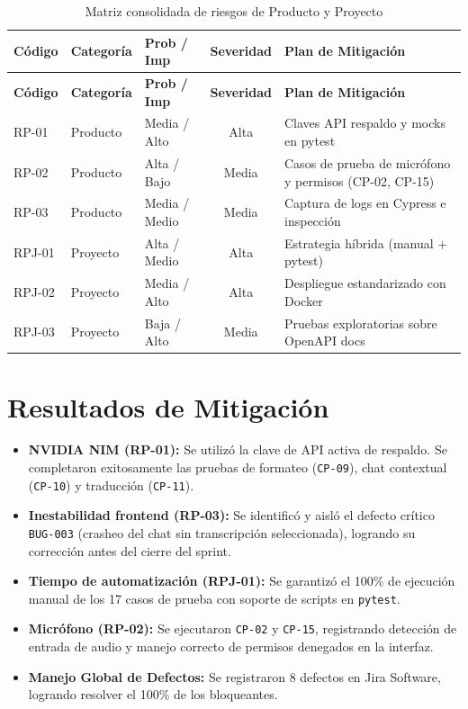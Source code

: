 \begin{longtable}{lllcp{4cm}}
\caption{Matriz consolidada de riesgos de Producto y Proyecto}
\label{tab:riesgos}\\
\toprule
\textbf{Código} & \textbf{Categoría} & \textbf{Prob / Imp} & \textbf{Severidad} & \textbf{Plan de Mitigación}\\
\midrule
\endfirsthead
\toprule
\textbf{Código} & \textbf{Categoría} & \textbf{Prob / Imp} & \textbf{Severidad} & \textbf{Plan de Mitigación}\\
\midrule
\endhead
\bottomrule
\endfoot

RP-01 & Producto & Media / Alto & Alta & Claves API respaldo y mocks en pytest\\

RP-02 & Producto & Alta / Bajo & Media & Casos de prueba de micrófono y permisos (CP-02, CP-15)\\

RP-03 & Producto & Media / Medio & Media & Captura de logs en Cypress e inspección\\

RPJ-01 & Proyecto & Alta / Medio & Alta & Estrategia híbrida (manual + pytest)\\

RPJ-02 & Proyecto & Media / Alto & Alta & Despliegue estandarizado con Docker\\

RPJ-03 & Proyecto & Baja / Alto & Media & Pruebas exploratorias sobre OpenAPI docs\\

\end{longtable}

\section{Resultados de Mitigación}
\label{sec:resultados-mitigacion}

\begin{itemize}
    \item \textbf{NVIDIA NIM (RP-01):} Se utilizó la clave de API activa de respaldo. Se completaron exitosamente las pruebas de formateo (\texttt{CP-09}), chat contextual (\texttt{CP-10}) y traducción (\texttt{CP-11}).
    \item \textbf{Inestabilidad frontend (RP-03):} Se identificó y aisló el defecto crítico \texttt{BUG-003} (crasheo del chat sin transcripción seleccionada), logrando su corrección antes del cierre del sprint.
    \item \textbf{Tiempo de automatización (RPJ-01):} Se garantizó el 100\% de ejecución manual de los 17 casos de prueba con soporte de scripts en \texttt{pytest}.
    \item \textbf{Micrófono (RP-02):} Se ejecutaron \texttt{CP-02} y \texttt{CP-15}, registrando detección de entrada de audio y manejo correcto de permisos denegados en la interfaz.
    \item \textbf{Manejo Global de Defectos:} Se registraron 8 defectos en Jira Software, logrando resolver el 100\% de los bloqueantes.
\end{itemize}
